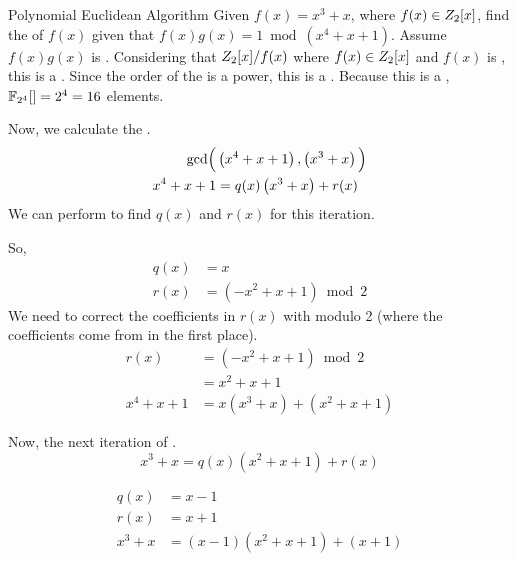 \begin{example}[Lecture 3]{Polynomial Euclidean Algorithm}
  Given $f(x) = x^{3} + x$, where $f(x) \in Z_{2}[x]$, find the  of $f(x)$ given that $f(x) g(x) = 1 \bmod \left( x^{4} + x + 1 \right)$.
    Assume $f(x) g(x)$ is .
    \tcblower{}
    Considering that $Z_{2}[x] / f(x)$ where $f(x) \in Z_{2}[x]$ and $f(x)$ is , this is a .
    Since the order of the  is a  power, this is a .
    Because this is a , $\mathbb{F}_{2^{4}}[] = 2^{4} = 16$ elements.
    
    Now, we calculate the .
    \begin{align*}
      \gcd \Bigl( &\left( x^{4} + x + 1 \right), \left( x^{3} + x \right) \Bigl) \\
      x^{4} + x + 1 &= q(x) \left( x^{3} + x \right) + r(x) \\
    \end{align*}
    We can perform  to find $q(x)$ and $r(x)$ for this iteration.
    \begin{center}
    \end{center}
    So,
    \begin{align*}
      q(x) &= x \\
      r(x) &= \left( -x^{2} + x + 1 \right) \bmod 2
    \end{align*}
    We need to correct the coefficients in $r(x)$ with modulo 2 (where the coefficients come from in the first place).
    \begin{align*}
      r(x) &= \left( -x^{2} + x + 1 \right) \bmod 2 \\
           &= x^{2} + x + 1 \\
      x^{4} + x + 1 &= x \left( x^{3} + x \right) + \left( x^{2} + x + 1 \right)
    \end{align*}

    Now, the next iteration of .
    \begin{equation*}
      x^{3} + x = q(x) \left( x^{2} + x + 1 \right) + r(x)
    \end{equation*}
    \begin{center}
    \end{center}
    \begin{align*}
      q(x) &= x-1 \\
      r(x) &= x+1 \\
      x^{3} + x &= (x-1) \left( x^{2} + x + 1 \right) + (x+1)
    \end{align*}


\end{example}
